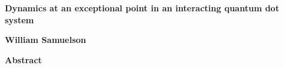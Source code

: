 \documentclass[../main.tex]{subfiles}
\begin{document}
\thispagestyle{plain}
\begin{center}
    \Large
    \textbf{Dynamics at an exceptional point in an interacting quantum dot system}
    
    \vspace{0.4cm}
    
    \vspace{0.4cm}
    \textbf{William Samuelson}
    
    \vspace{0.9cm}
    \textbf{Abstract}
\end{center}
\lipsum[1-1]
\end{document}
